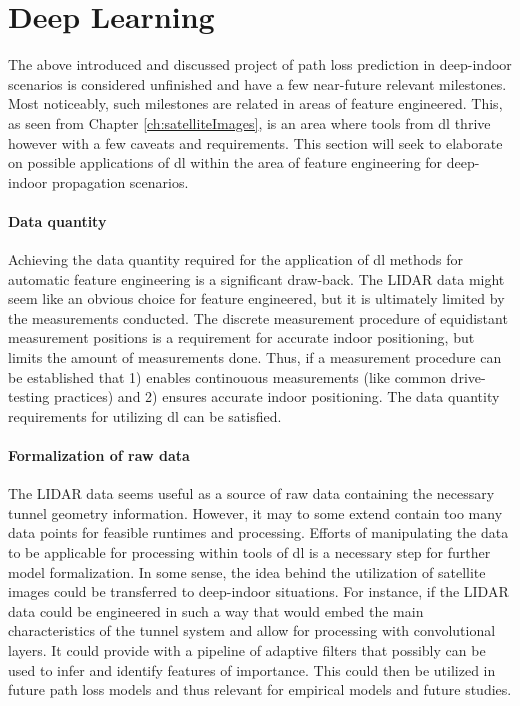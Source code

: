 \section{Deep Learning}

The above introduced and discussed project of path loss prediction in deep-indoor scenarios is considered unfinished and have a few near-future relevant milestones. Most noticeably, such milestones are related in areas of feature engineered. This, as seen from Chapter \ref{ch:satelliteImages}, is an area where tools from \gls{dl} thrive however with a few caveats and requirements. This section will seek to elaborate on possible applications of \gls{dl} within the area of feature engineering for deep-indoor propagation scenarios.

\paragraph{Data quantity}

Achieving the data quantity required for the application of \gls{dl} methods for automatic feature engineering is a significant draw-back. The LIDAR data might seem like an obvious choice for feature engineered, but it is ultimately limited by the measurements conducted. The discrete measurement procedure of equidistant measurement positions is a requirement for accurate indoor positioning, but limits the amount of measurements done. Thus, if a measurement procedure can be established that 1) enables continouous measurements (like common drive-testing practices) and 2) ensures accurate indoor positioning. The data quantity requirements for utilizing \gls{dl} can be satisfied. 

\paragraph{Formalization of raw data}
The LIDAR data seems useful as a source of raw data containing the necessary tunnel geometry information. However, it may to some extend contain too many data points for feasible runtimes and processing. Efforts of manipulating the data to be applicable for processing within tools of \gls{dl} is a necessary step for further model formalization. In some sense, the idea behind the utilization of satellite images could be transferred to deep-indoor situations. For instance, if the LIDAR data could be engineered in such a way that would embed the main characteristics of the tunnel system and allow for processing with convolutional layers. It could provide with a pipeline of adaptive filters that possibly can be used to infer and identify features of importance. This could then be utilized in future path loss models and thus relevant for empirical models and future studies. 


